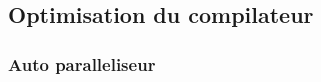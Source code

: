 \documentclass[oneside,11pt]{article}
\begin{document}
\begin{empfile}
\subsection{Optimisation du compilateur}

\subsubsection{Auto paralleliseur}






\end{empfile}



\end{document}

